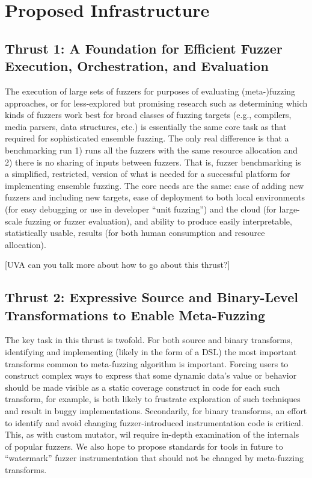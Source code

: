\documentclass[numbers]{proposalnsf}
\begin{document}
\section{Proposed Infrastructure}

\subsection{Thrust 1: A Foundation for Efficient Fuzzer Execution, Orchestration, and Evaluation}

The execution of large sets of fuzzers for purposes of evaluating (meta-)fuzzing approaches, or for less-explored but promising research such as determining which kinds of fuzzers work best for broad classes of fuzzing targets (e.g., compilers, media parsers, data structures, etc.) is essentially the same core task as that required for sophisticated ensemble fuzzing.  The only real difference is that a benchmarking run 1) runs all the fuzzers with the same resource allocation and 2) there is no sharing of inputs between fuzzers.  That is, fuzzer benchmarking is a simplified, restricted, version of what is needed for a successful platform for implementing ensemble fuzzing.  The core needs are the same: ease of adding new fuzzers and including new targets, ease of deployment to both local environments (for easy debugging or use in developer ``unit fuzzing'') and the cloud (for large-scale fuzzing or fuzzer evaluation), and ability to produce easily interpretable, statistically usable, results (for both human consumption and resource allocation).

[UVA can you talk more about how to go about this thrust?]

\subsection{Thrust 2: Expressive Source and Binary-Level Transformations to Enable Meta-Fuzzing}

The key task in this thrust is twofold.  For both source and binary transforms, identifying and implementing (likely in the form of a DSL) the most important transforms common to meta-fuzzing algorithm is important.  Forcing users to construct complex ways to express that some dynamic data's value or behavior should be made visible as a static coverage construct in code for each such transform, for example, is both likely to frustrate exploration of such techniques and result in buggy implementations.  Secondarily, for binary transforms, an effort to identify and avoid changing fuzzer-introduced instrumentation code is critical.  This, as with custom mutator, wil require in-depth examination of the internals of popular fuzzers.  We also hope to propose standards for tools in future to ``watermark'' fuzzer instrumentation that should not be changed by meta-fuzzing transforms.
\end{document}
